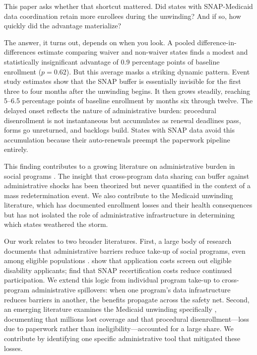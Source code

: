 \documentclass[12pt]{article}
\begin{document}
This paper asks whether that shortcut mattered. Did states with SNAP-Medicaid data coordination retain more enrollees during the unwinding? And if so, how quickly did the advantage materialize?

The answer, it turns out, depends on when you look. A pooled difference-in-differences estimate comparing waiver and non-waiver states finds a modest and statistically insignificant advantage of 0.9 percentage points of baseline enrollment ($p = 0.62$). But this average masks a striking dynamic pattern. Event study estimates show that the SNAP buffer is essentially invisible for the first three to four months after the unwinding begins. It then grows steadily, reaching 5--6.5 percentage points of baseline enrollment by months six through twelve. The delayed onset reflects the nature of administrative burden: procedural disenrollment is not instantaneous but accumulates as renewal deadlines pass, forms go unreturned, and backlogs build. States with SNAP data avoid this accumulation because their auto-renewals preempt the paperwork pipeline entirely.

This finding contributes to a growing literature on administrative burden in social programs \citep{herd2018administrative, deshpande2019gets}. The insight that cross-program data sharing can buffer against administrative shocks has been theorized \citep{currie2006take} but never quantified in the context of a mass redetermination event. We also contribute to the Medicaid unwinding literature, which has documented enrollment losses \citep{sommers2024unwinding} and their health consequences but has not isolated the role of administrative infrastructure in determining which states weathered the storm.

Our work relates to two broader literatures. First, a large body of research documents that administrative barriers reduce take-up of social programs, even among eligible populations \citep{currie2006take, finkelstein2019take, homonoff2021program}. \citet{deshpande2019gets} show that application costs screen out eligible disability applicants; \citet{homonoff2021program} find that SNAP recertification costs reduce continued participation. We extend this logic from individual program take-up to cross-program administrative spillovers: when one program's data infrastructure reduces barriers in another, the benefits propagate across the safety net. Second, an emerging literature examines the Medicaid unwinding specifically \citep{sommers2024unwinding, gordon2023medicaid}, documenting that millions lost coverage and that procedural disenrollment---loss due to paperwork rather than ineligibility---accounted for a large share. We contribute by identifying one specific administrative tool that mitigated these losses.
\end{document}
